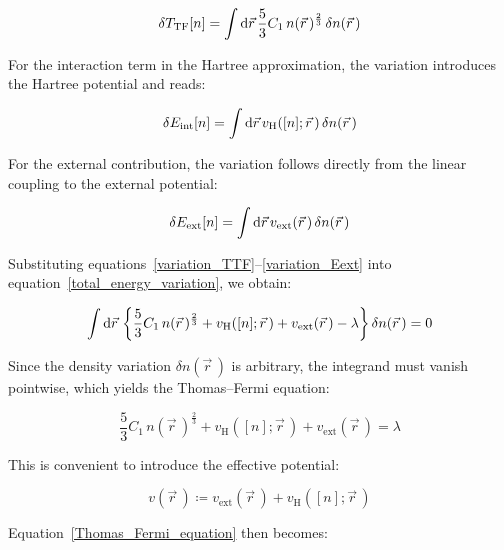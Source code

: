 \begin{equation}
    \delta T_\mathrm{TF}[n]
    = \int\mathrm{d}{\vec{r}}\,\frac{5}{3}C_1\,n(\vec{r}\,)^{\frac{2}{3}}\,\delta n(\vec{r}\,)
\label{variation_TTF}
\end{equation}

For the interaction term in the Hartree approximation, the variation introduces the Hartree potential and reads:

\begin{equation}
    \delta E_\mathrm{int}[n]
    = \int\mathrm{d}{\vec{r}}\,v_\mathrm{H}([n];\vec{r}\,)\,\delta n(\vec{r}\,)
\label{variation_Eint}
\end{equation}

For the external contribution, the variation follows directly from the linear coupling to the external potential:

\begin{equation}
    \delta E_\mathrm{ext}[n]
    = \int\mathrm{d}{\vec{r}}\,v_\mathrm{ext}(\vec{r}\,)\,\delta n(\vec{r}\,)
\label{variation_Eext}
\end{equation}

Substituting equations~\eqref{variation_TTF}--\eqref{variation_Eext} into equation~\eqref{total_energy_variation}, we obtain:

\begin{equation}
    \int\mathrm{d}{\vec{r}}\,\left\{\frac{5}{3}C_1\,n(\vec{r}\,)^{\frac{2}{3}}+v_\mathrm{H}([n];\vec{r}\,)+v_\mathrm{ext}(\vec{r}\,)-\lambda\right\}\delta n(\vec{r}\,)=0
\label{total_energy_minimization}
\end{equation}

Since the density variation $\delta n(\vec{r}\,)$ is arbitrary, the integrand must vanish pointwise, which yields the Thomas--Fermi equation:

\begin{equation}
    \frac{5}{3}C_1\,n(\vec{r}\,)^{\frac{2}{3}}+v_\mathrm{H}([n];\vec{r}\,)+v_\mathrm{ext}(\vec{r}\,)=\lambda
\label{Thomas_Fermi_equation}
\end{equation}

This is convenient to introduce the effective potential:

\begin{equation}
    v(\vec{r}\,)\coloneqq v_\mathrm{ext}(\vec{r}\,)+v_\mathrm{H}([n];\vec{r}\,)
\label{effective_potential_definition}
\end{equation}

Equation~\eqref{Thomas_Fermi_equation} then becomes:


